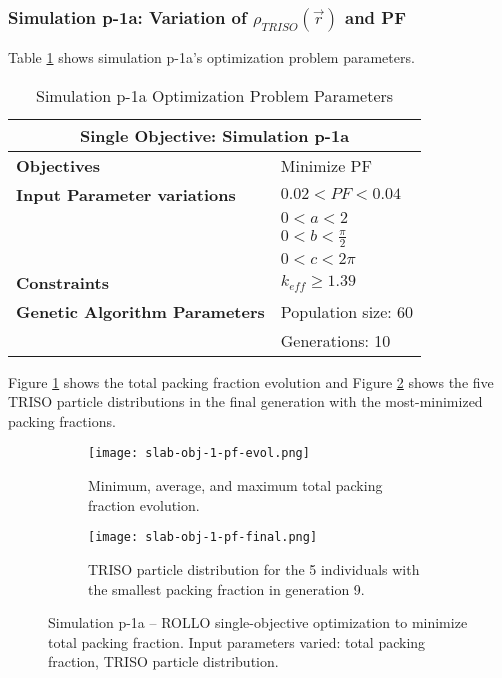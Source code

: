 \subsubsection{Simulation p-1a: Variation of $\rho_{TRISO}(\vec{r})$ and PF}
Table \ref{tab:simulationp1a} shows simulation p-1a's optimization problem parameters. 
\begin{table}[htbp]
    \centering
    \onehalfspacing
    \caption{Simulation p-1a Optimization Problem Parameters}
	\label{tab:simulationp1a}
    \footnotesize
    \begin{tabular}{l|p{3cm}}
    \hline 
    \multicolumn{2}{c}{\textbf{Single Objective: Simulation p-1a}} \\
    \hline 
    \textbf{Objectives} & Minimize PF \\
    \hline 
    \textbf{Input Parameter variations} & $0.02<PF<0.04$ \\
    & $0<a<2$ \\
    & $0<b<\frac{\pi}{2}$ \\
    & $0<c<2\pi$ \\
    \hline
    \textbf{Constraints} & $k_{eff} \geq 1.39$\\ 
    \hline 
    \textbf{Genetic Algorithm Parameters} & Population size: 60 \\
    & Generations: 10 \\
    \hline
    \end{tabular}
\end{table}
Figure \ref{fig:slab-obj-1-pf-evol} shows the total packing fraction evolution and 
Figure \ref{fig:slab-obj-1-pf-final} shows the five TRISO particle distributions in 
the final generation with the most-minimized packing fractions. 
\begin{figure}[htbp]
    \centering
    \begin{subfigure}{\textwidth}
        \texttt{[image: slab-obj-1-pf-evol.png]}
        \caption{Minimum, average, and maximum total packing fraction evolution.}
        \label{fig:slab-obj-1-pf-evol} 
    \end{subfigure}
    \begin{subfigure}{\textwidth}
        \texttt{[image: slab-obj-1-pf-final.png]}
        \caption{TRISO particle distribution for the 5 individuals with the 
        smallest packing fraction in generation 9.}
        \label{fig:slab-obj-1-pf-final} 
    \end{subfigure}
    \caption{Simulation p-1a -- ROLLO single-objective optimization to minimize total 
    packing fraction. Input parameters varied: total packing fraction, TRISO particle 
    distribution.}
    \label{fig:slab-obj-1-pf}
\end{figure}
